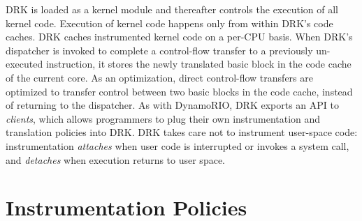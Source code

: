 \documentclass[letterpaper,twocolumn,10pt]{article}
\begin{document}
DRK is loaded as a kernel module and thereafter controls the execution of all kernel code. Execution of kernel code happens only from within DRK's code caches. DRK caches instrumented kernel code on a per-CPU basis. When DRK's dispatcher is invoked to complete a control-flow transfer to a previously un-executed instruction, it stores the newly translated basic block in the code cache of the current core. As an optimization, direct control-flow transfers are optimized to transfer control between two basic blocks in the code cache, instead of returning to the dispatcher. As with DynamoRIO, DRK exports an API to \emph{clients}, which allows programmers to plug their own instrumentation and translation policies into DRK. DRK takes care not to instrument user-space code: instrumentation \emph{attaches} when user code is interrupted or invokes a system call, and \emph{detaches} when execution returns to user space.


\section{Instrumentation Policies}\label{sec:policies}
\end{document}
